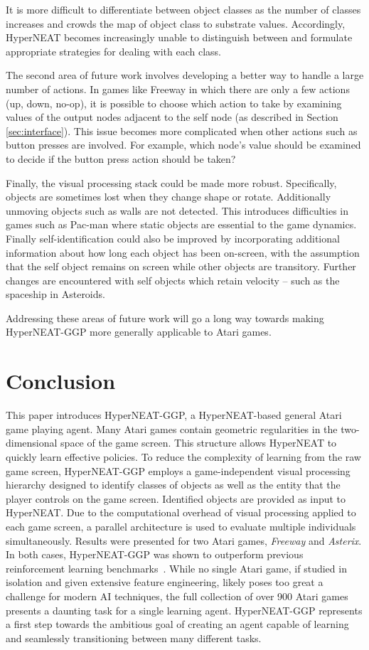 \documentclass{sig-alternate}
\begin{document}
It is more difficult to differentiate between object classes as the number of classes increases and crowds the map of object class to substrate values. Accordingly, HyperNEAT becomes increasingly unable to distinguish between and formulate appropriate strategies for dealing with each class.

The second area of future work involves developing a better way to handle a large number of actions. In games like Freeway in which there are only a few actions (up, down, no-op), it is possible to choose which action to take by examining values of the output nodes adjacent to the self node (as described in Section \ref{sec:interface}). This issue becomes more complicated when other actions such as button presses are involved. For example, which node's value should be examined to decide if the button press action should be taken? 

Finally, the visual processing stack could be made more robust. Specifically, objects are sometimes lost when they change shape or rotate. Additionally unmoving objects such as walls are not detected. This introduces difficulties in games such as Pac-man where static objects are essential to the game dynamics. Finally self-identification could also be improved by incorporating additional information about how long each object has been on-screen, with the assumption that the self object remains on screen while other objects are transitory. Further changes are encountered with self objects which retain velocity -- such as the spaceship in Asteroids. 

Addressing these areas of future work will go a long way towards making HyperNEAT-GGP more generally applicable to Atari games.

\section{Conclusion}
\label{sec:conclusion}
This paper introduces HyperNEAT-GGP, a HyperNEAT-based general Atari game playing agent. Many Atari games contain geometric regularities in the two-dimensional space of the game screen. This structure allows HyperNEAT to quickly learn effective policies. To reduce the complexity of learning from the raw game screen, HyperNEAT-GGP employs a game-independent visual processing hierarchy designed to identify classes of objects as well as the entity that the player controls on the game screen. Identified objects are provided as input to HyperNEAT. Due to the computational overhead of visual processing applied to each game screen, a parallel architecture is used to evaluate multiple individuals simultaneously. Results were presented for two Atari games, \textit{Freeway} and \textit{Asterix}. In both cases, HyperNEAT-GGP was shown to outperform previous reinforcement learning benchmarks~\cite{naddaf10}. While no single Atari game, if studied in isolation and given extensive feature engineering, likely poses too great a challenge for modern AI techniques, the full collection of over 900 Atari games presents a daunting task for a single learning agent. HyperNEAT-GGP represents a first step towards the ambitious goal of creating an agent capable of learning and seamlessly transitioning between many different tasks.
\end{document}
